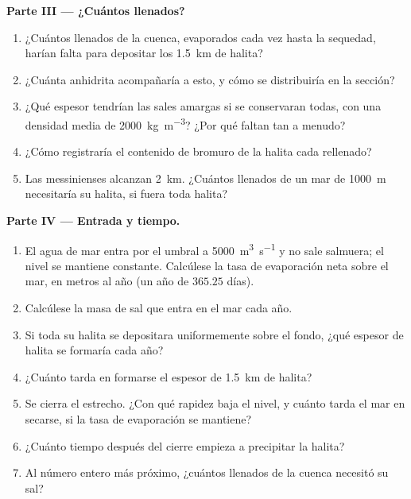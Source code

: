 \begin{problem}
\noindent\textbf{Parte III --- ¿Cuántos llenados?}
\begin{enumerate}[resume]
  \item ¿Cuántos llenados de la cuenca, evaporados cada vez hasta la sequedad, harían falta para depositar los \qty{1.5}{km} de halita?
  \item ¿Cuánta anhidrita acompañaría a esto, y cómo se distribuiría en la sección?
  \item ¿Qué espesor tendrían las sales amargas si se conservaran todas, con una densidad media de \qty{2000}{kg.m^{-3}}? ¿Por qué faltan tan a menudo?
  \item ¿Cómo registraría el contenido de bromuro de la halita cada rellenado?
  \item Las  messinienses alcanzan \qty{2}{km}. ¿Cuántos llenados de un mar de \qty{1000}{m} necesitaría su halita, si fuera toda halita?
\end{enumerate}

\noindent\textbf{Parte IV --- Entrada y tiempo.}
\begin{enumerate}[resume]
  \item El agua de mar entra por el umbral a \qty{5000}{m^3.s^{-1}} y no sale salmuera; el nivel se mantiene constante. Calcúlese la tasa de evaporación neta sobre el mar, en metros al año
        (un año de $365.25$ días).
  \item Calcúlese la masa de sal que entra en el mar cada año.
  \item Si toda su halita se depositara uniformemente sobre el fondo, ¿qué espesor de halita se formaría cada año?
  \item ¿Cuánto tarda en formarse el espesor de \qty{1.5}{km} de halita?
  \item Se cierra el estrecho. ¿Con qué rapidez baja el nivel, y cuánto tarda el mar en secarse, si la tasa de evaporación se mantiene?
  \item ¿Cuánto tiempo después del cierre empieza a precipitar la halita?
  \item Al número entero más próximo, ¿cuántos llenados de la cuenca necesitó su sal?
\end{enumerate}
\end{problem}

